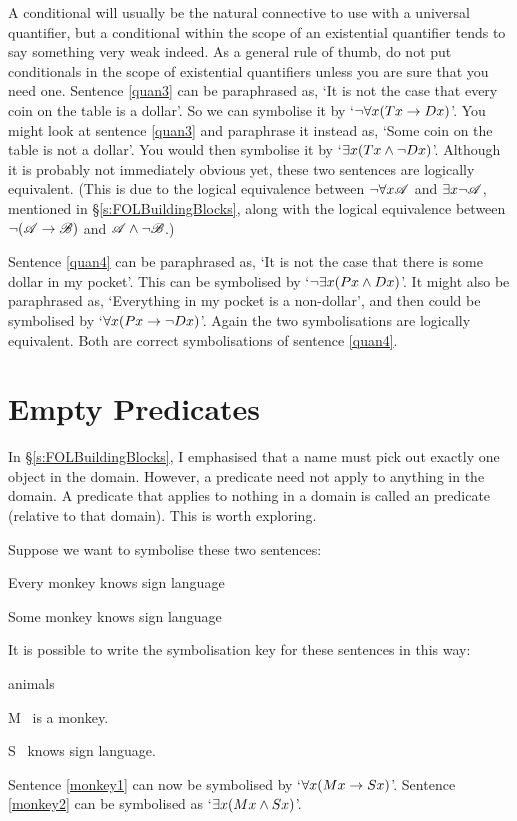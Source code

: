 A conditional will usually be the natural connective to use with a universal quantifier, but a conditional within the scope of an existential quantifier tends to say something very weak indeed. As a general rule of thumb, do not put conditionals in the scope of existential quantifiers unless you are sure that you need one.
Sentence \ref{quan3} can be paraphrased as, `It is not the case that every coin on the table is a dollar'. So we can symbolise it by `$\neg \forall x(Tx \rightarrow Dx)$'. You might look at sentence \ref{quan3} and paraphrase it instead as, `Some coin on the table is not a dollar'. You would then symbolise it by `$\exists x(Tx \wedge \neg Dx)$'. Although it is probably not immediately obvious yet, these two sentences are logically equivalent. (This is due to the logical equivalence between $\neg\forall x\mathscr{A}$ and $\exists x\neg\mathscr{A}$, mentioned in §\ref{s:FOLBuildingBlocks}, along with the logical equivalence between $\neg(\mathscr{A}\rightarrow\mathscr{B})$ and $\mathscr{A}\wedge\neg\mathscr{B}$.)

Sentence \ref{quan4} can be paraphrased as, `It is not the case that there is some dollar in my pocket'. This can be symbolised by `$\neg\exists x(Px \wedge Dx)$'. It might also be paraphrased as, `Everything in my pocket is a non-dollar', and then could be symbolised by `$\forall x(Px \rightarrow \neg Dx)$'. Again the two symbolisations are logically equivalent. Both are correct symbolisations of sentence \ref{quan4}.


\section{Empty Predicates}
In §\ref{s:FOLBuildingBlocks}, I emphasised that a name must pick out exactly one object in the domain. However, a predicate need not apply to anything in the domain. A predicate that applies to nothing in a domain is called an  predicate (relative to that domain). This is worth exploring.

Suppose we want to symbolise these two sentences:
	\begin{earg}
		\item[\ex{monkey1}] Every monkey knows sign language
		\item[\ex{monkey2}] Some monkey knows sign language
	\end{earg}
It is possible to write the symbolisation key for these sentences in this way:
	\begin{ekey}
		\item[\text{domain}] animals
		\item[M] \blank\ is a monkey.
		\item[S] \blank\ knows sign language.
	\end{ekey}
Sentence \ref{monkey1} can now be symbolised by `$\forall x(Mx \rightarrow Sx)$'. Sentence \ref{monkey2} can be symbolised as `$\exists x(Mx \wedge Sx)$'.

